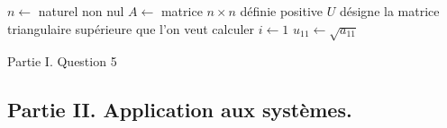 \begin{algorithm}
  $n\leftarrow $ naturel non  nul\;
  $A\leftarrow $ matrice $n\times n$ définie positive \;
  $U$ désigne la matrice triangulaire supérieure que l'on veut calculer \;
  $i\leftarrow 1$\;
  $u_{1 1} \leftarrow \sqrt{a_{1 1}}$\;
  \caption{Partie I. Question 5}
  \label{Ccholesky_1}
\end{algorithm}

\subsection*{Partie II. Application aux systèmes.}

